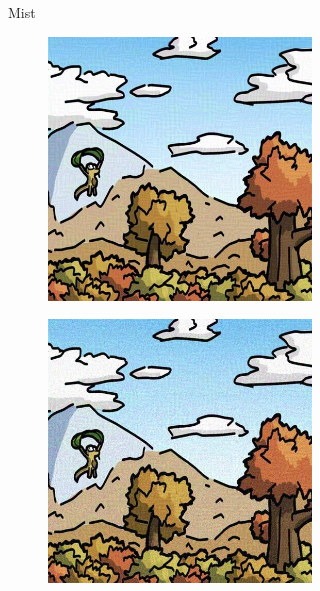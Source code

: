 \documentclass{article}
\begin{document}
\begin{figure}[h]
\begin{subfigure}[t]{\textwidth}
\begin{subfigure}[b]{0.24\textwidth}
     \end{subfigure}
    \caption{Mist}
    \vspace{0.5em}
    \end{subfigure}
    \begin{subfigure}[t]{\textwidth}
        \begin{subfigure}[b]{0.24\textwidth}
         \centering
         \includegraphics[width=\textwidth]{plots/process/antidb/0009.jpeg}
     \end{subfigure}
     \hfill
     \begin{subfigure}[b]{0.24\textwidth}
         \centering
         \includegraphics[width=\textwidth]{plots/process/preprocess/antidb/gaussian.jpg}

\end{subfigure}
\end{subfigure}
\end{figure}
\end{document}
